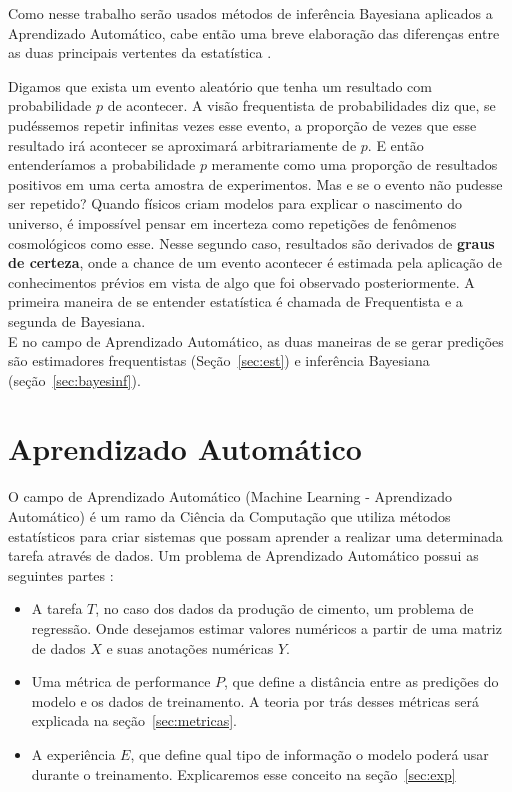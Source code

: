 Como nesse trabalho serão usados métodos de inferência Bayesiana aplicados a Aprendizado Automático,
cabe então uma breve elaboração das diferenças entre as duas principais
vertentes da estatística \citep{dlbook}. 

Digamos que exista um evento aleatório que tenha um resultado com probabilidade
$p$ de acontecer. A visão frequentista de probabilidades diz que, se pudéssemos
repetir infinitas vezes esse evento, a proporção de vezes que esse resultado irá
acontecer se aproximará arbitrariamente de $p$. E então entenderíamos a
probabilidade $p$ meramente como uma proporção de resultados positivos em uma
certa amostra de experimentos. Mas e se o evento não pudesse ser repetido?
Quando físicos criam modelos para explicar o nascimento do universo, é
impossível pensar em incerteza como repetições de fenômenos cosmológicos como esse. Nesse segundo caso, resultados são derivados de \textbf{graus de certeza}, onde a chance de um evento acontecer é estimada pela aplicação de conhecimentos prévios em vista de algo que foi observado posteriormente. A primeira maneira de se entender estatística é chamada de Frequentista e a segunda de Bayesiana. \\

E no campo de Aprendizado Automático, as duas maneiras de se gerar predições são estimadores
frequentistas (Seção~\ref{sec:est}) e inferência Bayesiana (seção~\ref{sec:bayesinf}).



\section{Aprendizado Automático}

O campo de Aprendizado Automático (Machine Learning - Aprendizado Automático) é um ramo da Ciência
da Computação que utiliza métodos estatísticos para criar sistemas que possam
aprender a realizar uma determinada tarefa através de dados. Um problema de Aprendizado Automático possui
as seguintes partes \citep{dlbook}: \\

\begin{itemize}

  
\item A tarefa $T$, no caso dos dados da produção de cimento, um problema de regressão.
  Onde desejamos estimar valores numéricos a partir de uma matriz de dados $X$ e
  suas anotações numéricas $Y$. 
  
\item Uma métrica de performance $P$, que define a distância entre as predições
  do modelo e os dados de treinamento. A teoria por trás desses métricas será explicada na seção~\ref{sec:metricas}.

\item A experiência $E$, que define qual tipo de informação o modelo poderá usar
  durante o treinamento. Explicaremos esse conceito na seção~\ref{sec:exp} 
  
\end{itemize}

